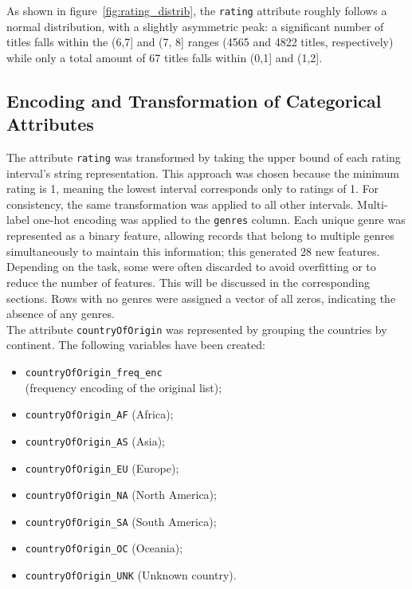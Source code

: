As shown in figure~\ref{fig:rating_distrib}, the \texttt{rating} attribute roughly follows a normal distribution, with a slightly asymmetric peak:
a significant number of titles falls within the (6,7] and (7, 8] ranges (4565 and 4822 titles, respectively) while only a total amount of 67 titles falls within (0,1] and (1,2].


\subsection{Encoding and Transformation of Categorical Attributes}
The attribute \texttt{rating} was transformed by taking the upper bound of each rating
interval's string representation. This approach was chosen because the minimum rating is 1, meaning the
lowest interval corresponds only to ratings of 1. For consistency, the same transformation was applied
to all other intervals.
Multi-label one-hot encoding was applied to the \texttt{genres} column. 
Each unique genre was represented as a binary feature, allowing records that belong to multiple genres simultaneously to maintain this information; this generated 28 new features.
Depending on the task, some were often discarded to avoid overfitting or to reduce the number of features.
This will be discussed in the corresponding sections.
Rows with no genres were assigned a vector of all zeros, indicating the absence of any genres.\\

The attribute \texttt{countryOfOrigin} was represented by grouping the countries by continent.
The following variables have been created: 
\begin{multicols}{2}
    \begin{itemize}
        \item \texttt{countryOfOrigin\_freq\_enc}\\ 
        (frequency encoding of the original list);
        \item \texttt{countryOfOrigin\_AF} (Africa);
        \item \texttt{countryOfOrigin\_AS} (Asia);
        \item \texttt{countryOfOrigin\_EU} (Europe);
        \item \texttt{countryOfOrigin\_NA} (North America);
        \item \texttt{countryOfOrigin\_SA} (South America);
        \item \texttt{countryOfOrigin\_OC} (Oceania);
        \item \texttt{countryOfOrigin\_UNK} (Unknown country).
    \end{itemize}
\end{multicols}


